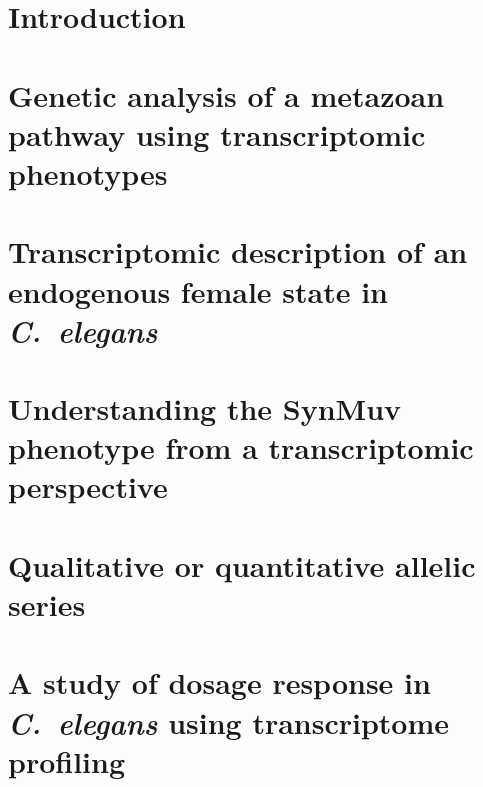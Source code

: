\documentclass[12pt]{caltech_thesis}
\newcommand{\cel}{\emph{C.~elegans}}
\begin{document}
\tableofcontents
\listoffigures
\listoftables
\printnomenclature{}

\mainmatter{}

\chapter{Introduction}
\begin{refsection}
  
  \printbibliography[heading=subbibliography]
\end{refsection}

\chapter{Genetic analysis of a metazoan pathway using transcriptomic phenotypes}
\begin{refsection}
  
  \printbibliography[heading=subbibliography]
\end{refsection}

\chapter{Transcriptomic description of an endogenous female state in \cel{}}
\begin{refsection}
  
  \printbibliography[heading=subbibliography]
\end{refsection}

\chapter{Understanding the SynMuv phenotype from a transcriptomic perspective}
\begin{refsection}
\end{refsection}

\chapter{Qualitative or quantitative allelic series}
\begin{refsection}
\end{refsection}

\chapter{A study of dosage response in \cel{} using transcriptome profiling}
\begin{refsection}
\end{refsection}
\end{document}
